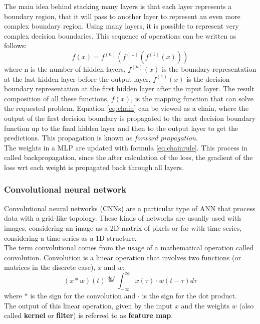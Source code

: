 The main idea behind stacking many layers is that each layer represents a boundary region, that it will pass to another layer to represent an even more complex boundary region. Using many layers, it is possible to represent very complex decision boundaries. This sequence of operations can be written as follows:
\begin{equation}\label{eq:chain}
f(x) = f^{(n)}( f^{(...)}( f^{(1)}(x)) )
\end{equation}
\noindent where n is the number of hidden layers, $f^{(n)}(x)$ is the boundary representation at the last hidden layer before the output layer, $f^{(1)}(x)$ is the decision boundary representation at the first hidden layer after the input layer. The result composition of all these functions, $f(x)$, is the mapping function that can solve the requested problem. Equation \ref{eq:chain} can be viewed as a chain, where the output of the first decision boundary is propagated to the next decision boundary function up to the final hidden layer and then to the output layer to get the predictions. This propagation is known as \emph{forward propagation}.\\

The weights in a \gls{MLP} are updated with formula \ref{eq:chainrule}. This process in called backpropagation, since the after calculation of the loss, the gradient of the loss \gls{wrt} each weight is propagated back through all layers.

\subsubsection{Convolutional neural network}
Convolutional neural networks (\glspl{CNN}) are a particular type of \gls{ANN} that process data with a grid-like topology. These kinds of networks are usually used with images, considering an image as a 2D matrix of pixels or for with time series, considering a time series as a 1D structure. \\

The term convolutional comes from the usage of a mathematical operation called convolution. Convolution is a linear operation that involves two functions (or matrices in the discrete case), $x$ and $w$:
\begin{equation}
    (x \ast w)(t) \overset{def}{=} \int_{-\infty}^{\infty} x(\tau) \cdot w(t-\tau) d\tau
\end{equation}
\noindent where $\ast$ is the sign for the convolution and $\cdot$ is the sign for the dot product.\\
The output of this linear operation, given by the input $x$ and the weights $w$ (also called \textbf{kernel} or \textbf{filter}) is referred to as \textbf{feature map}. \\

